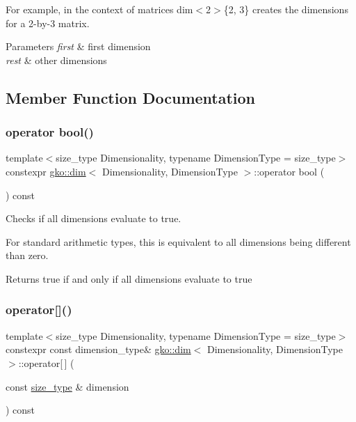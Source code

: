 For example, in the context of matrices {\ttfamily dim$<$2$>$\{2, 3\}} creates the dimensions for a 2-\/by-\/3 matrix.


\begin{DoxyParams}{Parameters}
{\em first} & first dimension \\
\hline
{\em rest} & other dimensions \\
\hline
\end{DoxyParams}


\subsection{Member Function Documentation}
\mbox{\label{structgko_1_1dim_a250f37a972c7e3fd0cc4c173e46e577c}} 
\subsubsection{\texorpdfstring{operator bool()}{operator bool()}}
{\footnotesize\ttfamily template$<$size\+\_\+type Dimensionality, typename Dimension\+Type = size\+\_\+type$>$ \\
constexpr \hyperlink{structgko_1_1dim}{gko\+::dim}$<$ Dimensionality, Dimension\+Type $>$\+::operator bool (\begin{DoxyParamCaption}{ }\end{DoxyParamCaption}) const}



Checks if all dimensions evaluate to true. 

For standard arithmetic types, this is equivalent to all dimensions being different than zero.

\begin{DoxyReturn}{Returns}
true if and only if all dimensions evaluate to true 
\end{DoxyReturn}
\mbox{\label{structgko_1_1dim_a33151623775cbe4c229a3bd59046de36}} 
\subsubsection{\texorpdfstring{operator[]()}{operator[]()}\hspace{0.1cm}{\footnotesize\ttfamily [1/2]}}
{\footnotesize\ttfamily template$<$size\+\_\+type Dimensionality, typename Dimension\+Type = size\+\_\+type$>$ \\
constexpr const dimension\+\_\+type\& \hyperlink{structgko_1_1dim}{gko\+::dim}$<$ Dimensionality, Dimension\+Type $>$\+::operator\mbox{[}$\,$\mbox{]} (\begin{DoxyParamCaption}\item[{const \hyperlink{namespacegko_a6e5c95df0ae4e47aab2f604a22d98ee7}{size\+\_\+type} \&}]{dimension }\end{DoxyParamCaption}) const\hspace{0.3cm}{\ttfamily [noexcept]}}



